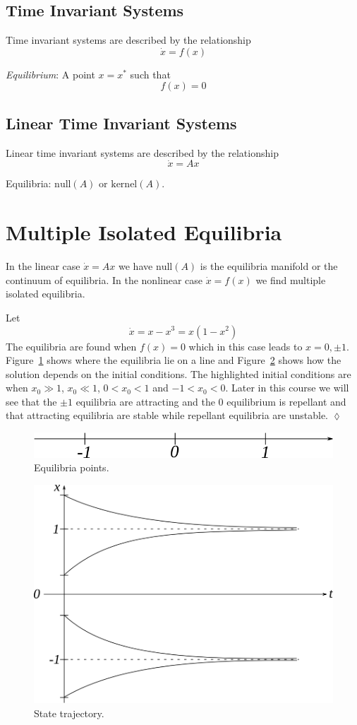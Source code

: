 \subsection{Time Invariant Systems}
Time invariant systems are described by the relationship
$$\dot{x}=f(x)$$
\begin{definition}
\textit{Equilibrium}: A point $x=x^\ast$ such that
$$f(x) = 0$$
\end{definition}

\subsection{Linear Time Invariant Systems}
Linear time invariant systems are described by the relationship
$$\dot{x}=Ax$$
\begin{definition}
Equilibria: $\text{null}(A)$ or $\text{kernel}(A)$.
\end{definition}

\section{Multiple Isolated Equilibria}
In the linear case $\dot{x}=Ax$ we have $\text{null}(A)$ is the equilibria manifold or the continuum of equilibria. In the nonlinear case $\dot{x}=f(x)$ we find multiple isolated equilibria.
\begin{example}
Let
$$\dot{x} = x-x^3 = x(1-x^2)$$
The equilibria are found when $f(x)=0$ which in this case leads to $x=0,\pm1$. Figure~\ref{fig:01roots} shows where the equilibria lie on a line and Figure~\ref{fig:01traj} shows how the solution depends on the initial conditions. The highlighted initial conditions are when $x_0\gg1$, $x_0\ll1$, $0<x_0<1$ and $-1<x_0<0$. Later in this course we will see that the $\pm1$ equilibria are attracting and the $0$ equilibrium is repellant and that attracting equilibria are stable while repellant equilibria are unstable.
$\lozenge$
\end{example}

\begin{figure}[ht!]
\centering
\includegraphics[width=.4\textwidth]{images/01roots}
\caption{Equilibria points.}
\label{fig:01roots}
\end{figure}

\begin{figure}[ht!]
\centering
\includegraphics[width=.4\textwidth]{images/01traj}
\caption{State trajectory.}
\label{fig:01traj}
\end{figure}

